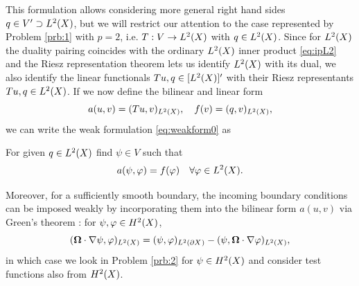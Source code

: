 This formulation
allows considering more general right hand sides \linebreak\mbox{$q \in V' \supset \Lp[2](X)$}, but we will restrict our
attention to the case represented by Problem \ref{prb:1} with $p = 2$, i.e. $T : V \to \Lp[2](X)$ with $q \in
\Lp[2](X)$.  Since for $\Lp[2](X)$ the duality pairing coincides with the ordinary $\Lp[2](X)$ inner product
\eqref{eq:ipL2} and the Riesz representation theorem lets us identify $\Lp[2](X)$ with its dual, we also identify the
linear functionals $Tu,q \in [\Lp[2](X)]'$ with their Riesz representants $Tu,q \in \Lp[2](X)$. If we now define
the bilinear and linear form $$ a(u,v) = \ip{\Lp[2](X)}{Tu,v}, \quad f(v) = \ip{\Lp[2](X)}{q,v}, $$
we can write the weak formulation \eqref{eq:weakform0} as
\begin{problem}\label{prb:2}
For given $q\in \Lp[2](X)$ find $\psi \in V$ such that
$$
	a(\psi, \varphi) = f(\varphi) \quad \forall \varphi\in\Lp[2](X).
$$
\end{problem}
%
%
Moreover, for a sufficiently smooth boundary, the incoming boundary conditions can be imposed weakly by incorporating
them into the bilinear form $a(u,v)$ via Green's theorem \cite[Thm. 2.24]{Agoshkov}:
for $\psi,\varphi\in \Hp[2](X)$,
$$\ip{\Lp[2](X)}{\bomega\cdot\nabla\psi, \varphi} = \ip{\Lp[2](\pX)}{\psi, \varphi} -
\ip{\Lp[2](X)}{\psi, \bomega\cdot\nabla\varphi},
$$
in which case we look in Problem \ref{prb:2} for $\psi \in \Hp[2](X)$ and consider test functions also from $\Hp[2](X)$.

